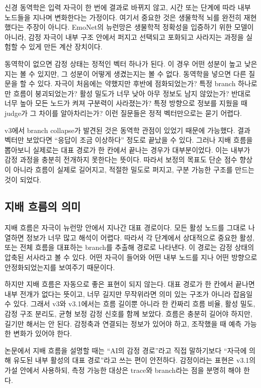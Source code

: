 \documentclass[11pt,a4paper]{article}
\begin{document}
신경 동역학은 입력 자극이 한 번에 결과로 바뀌지 않고, 시간 또는 단계에 따라 내부 노드들을 지나며 변화한다는 가정이다. 여기서 중요한 것은 생물학적 뇌를 완전히 재현했다는 주장이 아니다. EmoNet의 뉴런망은 생물학적 정확성을 입증하기 위한 모델이 아니라, 감정 자극이 내부 구조 안에서 퍼지고 선택되고 포화되고 사라지는 과정을 실험할 수 있게 만든 계산 장치이다.

동역학이 없으면 감정 상태는 정적인 벡터 하나가 된다. 이 경우 어떤 성분이 높고 낮은지는 볼 수 있지만, 그 성분이 어떻게 생겼는지는 볼 수 없다. 동역학을 넣으면 다른 질문을 할 수 있다. 자극이 처음에는 약했지만 후반에 점화되었는가? 특정 branch 하나로만 흐름이 붕괴되었는가? 활성 밀도가 너무 낮아 아무 정보도 남지 않았는가? 반대로 너무 높아 모든 노드가 켜져 구분력이 사라졌는가? 특정 방향으로 정보를 지웠을 때 judge가 그 차이를 알아차리는가? 이런 질문들은 정적 벡터만으로는 묻기 어렵다.

v3에서 branch collapse가 발견된 것은 동역학 관점이 있었기 때문에 가능했다. 결과 벡터만 보았다면 ``응답이 조금 이상하다'' 정도로 끝났을 수 있다. 그러나 지배 흐름을 뽑아보니 실제로는 대표 경로가 한 칸에서 끝나는 경우가 대부분이었다. 이는 내부가 감정 과정을 충분히 전개하지 못한다는 뜻이다. 따라서 보정의 목표도 단순 점수 향상이 아니라 흐름이 실제로 길어지고, 적절한 밀도로 퍼지고, 구분 가능한 구조를 만드는 것이 되었다.

\subsection{지배 흐름의 의미}

지배 흐름은 자극이 뉴런망 안에서 지나간 대표 경로이다. 모든 활성 노드를 그대로 나열하면 정보가 너무 많고 해석이 어렵다. 따라서 각 단계에서 상대적으로 중요한 활성, 또는 전체 흐름을 대표하는 branch를 추출해 경로로 나타낸다. 이 경로는 감정 상태의 압축된 서사라고 볼 수 있다. 어떤 자극이 들어와 어떤 내부 노드를 지나 어떤 방향으로 안정화되었는지를 보여주기 때문이다.

하지만 지배 흐름은 자동으로 좋은 표현이 되지 않는다. 대표 경로가 한 칸에서 끝나면 내부 전개가 없다는 뜻이고, 너무 길지만 무작위라면 의미 있는 구조가 아니라 잡음일 수 있다. 그래서 v3와 v3.1에서는 흐름 길이뿐 아니라 한 칸짜리 흐름 비율, 활성 밀도, 감정 구조 분리도, 균형 보정 감정 신호를 함께 보았다. 흐름은 충분히 길어야 하지만, 길기만 해서는 안 된다. 감정축과 연결되는 정보가 있어야 하고, 조작했을 때 예측 가능한 변화가 있어야 한다.

논문에서 지배 흐름을 설명할 때는 ``AI의 감정 경로''라고 직접 말하기보다 ``자극에 의해 유도된 내부 활성의 대표 경로''라고 쓰는 편이 안전하다. 감정이라는 표현은 v3.1의 가설 안에서 사용하되, 측정 가능한 대상은 trace와 branch라는 점을 분명히 해야 한다.
\end{document}
